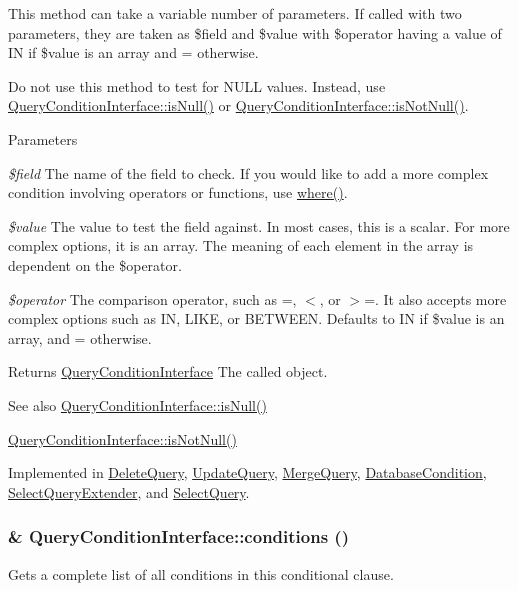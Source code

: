 This method can take a variable number of parameters. If called with two parameters, they are taken as \$field and \$value with \$operator having a value of IN if \$value is an array and = otherwise.

Do not use this method to test for NULL values. Instead, use \hyperlink{interfaceQueryConditionInterface_a2978b536a3fe62b21e940366c9cb5923}{QueryConditionInterface::isNull()} or \hyperlink{interfaceQueryConditionInterface_a8bbb6acc9c72911b165cf6eb1dc31453}{QueryConditionInterface::isNotNull()}.


\begin{DoxyParams}{Parameters}
\item[{\em \$field}]The name of the field to check. If you would like to add a more complex condition involving operators or functions, use \hyperlink{interfaceQueryConditionInterface_a42c03c74dd81ef6d77041e67ec12e735}{where()}. \item[{\em \$value}]The value to test the field against. In most cases, this is a scalar. For more complex options, it is an array. The meaning of each element in the array is dependent on the \$operator. \item[{\em \$operator}]The comparison operator, such as =, $<$, or $>$=. It also accepts more complex options such as IN, LIKE, or BETWEEN. Defaults to IN if \$value is an array, and = otherwise.\end{DoxyParams}
\begin{DoxyReturn}{Returns}
\hyperlink{interfaceQueryConditionInterface}{QueryConditionInterface} The called object.
\end{DoxyReturn}
\begin{DoxySeeAlso}{See also}
\hyperlink{interfaceQueryConditionInterface_a2978b536a3fe62b21e940366c9cb5923}{QueryConditionInterface::isNull()} 

\hyperlink{interfaceQueryConditionInterface_a8bbb6acc9c72911b165cf6eb1dc31453}{QueryConditionInterface::isNotNull()} 
\end{DoxySeeAlso}


Implemented in \hyperlink{classDeleteQuery_ae88c47d15ce798fd7d62620361eb4277}{DeleteQuery}, \hyperlink{classUpdateQuery_a850350cb972f539accbecf07daec23d2}{UpdateQuery}, \hyperlink{classMergeQuery_a40d55b36952248da6d8eabb0eb1a8430}{MergeQuery}, \hyperlink{classDatabaseCondition_a0cb79d38e9978eb08eb863f6564d0b1d}{DatabaseCondition}, \hyperlink{classSelectQueryExtender_a65446d6584a53f1c2be79dd1fd3bffdd}{SelectQueryExtender}, and \hyperlink{classSelectQuery_a742732edee2dc50e19be1d2cdb09537b}{SelectQuery}.\hypertarget{interfaceQueryConditionInterface_a894cc290ed61feb3693b1d459ae86888}{
\subsubsection[{conditions}]{\setlength{\rightskip}{0pt plus 5cm}\& QueryConditionInterface::conditions ()}}
\label{interfaceQueryConditionInterface_a894cc290ed61feb3693b1d459ae86888}
Gets a complete list of all conditions in this conditional clause.

